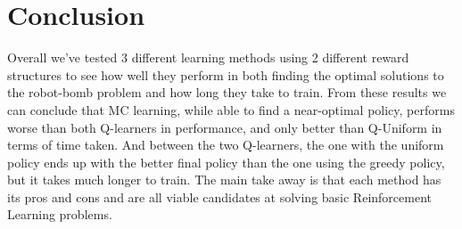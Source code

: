 \documentclass[12pt]{article}
\begin{document}
\section{Conclusion}

Overall we've tested 3 different learning methods using 2 different reward structures to see how well they perform in both finding the optimal solutions to the robot-bomb problem and how long they take to train. From these results we can conclude that MC learning, while able to find a near-optimal policy, performs worse than both Q-learners in performance, and only better than Q-Uniform in terms of time taken. And between the two Q-learners, the one with the uniform policy ends up with the better final policy than the one using the greedy policy, but it takes much longer to train. The main take away is that each method has its pros and cons and are all viable candidates at solving basic Reinforcement Learning problems.



\end{document}
